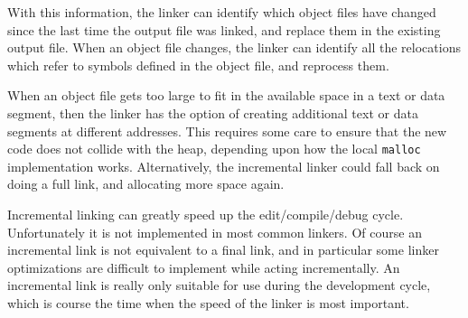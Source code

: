 With this information, the linker can identify which object files have changed
since the last time the output file was linked, and replace them in the
existing output file. When an object file changes, the linker can identify
all the relocations which refer to symbols defined in the object file, and
reprocess them.

When an object file gets too large to fit in the available space in a text
or data segment, then the linker has the option of creating additional text
or data segments at different addresses. This requires some care to ensure
that the new code does not collide with the heap, depending upon how the local
\texttt{malloc} implementation works. Alternatively, the incremental linker
could fall back on doing a full link, and allocating more space again.

Incremental linking can greatly speed up the edit/compile/debug cycle.
Unfortunately it is not implemented in most common linkers. Of course an
incremental link is not equivalent to a final link, and in particular some
linker optimizations are difficult to implement while acting incrementally. An
incremental link is really only suitable for use during the development cycle,
which is course the time when the speed of the linker is most important.
